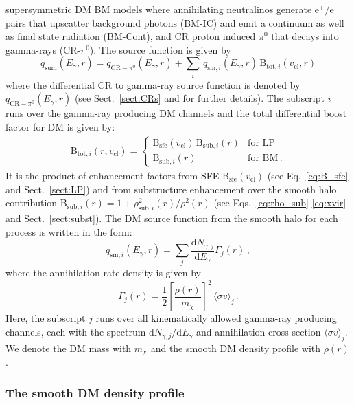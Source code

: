 \documentclass[10pt,aps,pra,reprint,amsmath,amsfonts,amssymb,showpacs,nofootinbib,floatfix]{revtex4-1}
\newcommand{\rmn}{\mathrm}
\newcommand{\sfe}{\rmn{sfe}}
\newcommand{\sub}{\rmn{sub}}
\newcommand{\B}{\rmn{B}}
\newcommand{\qCR}{q_{\rmn{CR}-\ensuremath{\pi^0}}}
\newcommand{\dd}{\rmn{d}}
\newcommand{\mx}{\ensuremath{m_{\chi}}}
\newcommand{\ngammaj}{\ensuremath{N_{\gamma,j}}}
\newcommand{\sigmaannv}{\ensuremath{\langle\sigma v\rangle}}
\newcommand{\sigv}{v_\rmn{cl}}
\newcommand{\egamma}{\ensuremath{E_{\gamma}}}
\newcommand{\eg}{E_\gamma}
\begin{document}
supersymmetric DM BM models where annihilating neutralinos generate
$\rmn{e}^+/\rmn{e}^-$ pairs that upscatter background photons (BM-IC)
and emit a continuum as well as final state radiation (BM-Cont), and
CR proton induced $\pi^0$ that decays into gamma-rays
(CR-$\pi^0$). The source function is given by
\begin{equation}
q_\rmn{sum} (\eg,r) = \qCR(\eg,r)+
\sum_i \,q_{\rmn{sm},i}(\eg,r)\,\B_{\rmn{tot},i}(\sigv,r)
\end{equation}
where the differential CR to gamma-ray source function is denoted
by $\qCR(\eg,r)$ (see Sect.~\ref{sect:CRs} and
\cite{2010MNRAS.409..449P} for further details). The subscript $i$
runs over the gamma-ray producing DM channels and the total
differential boost factor for DM is given by:
\begin{eqnarray}
\B_{\rmn{tot},i}(r,\sigv) = \left\{\begin{array}{cc}
\B_\sfe(\sigv)\,\B_{\sub,i}(r) &\rmn{for\,\,LP}\\
\B_{\sub,i}(r) &\rmn{for\,\,BM\,.}\end{array}\right.
\end{eqnarray}
It is the product of enhancement factors from SFE $\B_\sfe(\sigv)$
(see Eq.~\ref{eq:B_sfe} and Sect.~\ref{sect:LP}) and from substructure
enhancement over the smooth halo contribution $\B_{\sub,i}(r) =
1+\rho_{\sub,i}^2(r)/\rho^2(r)$ (see
Eqs.~\ref{eq:rho_sub}-\ref{eq:xvir} and Sect.~\ref{sect:subst}).  The
DM source function from the smooth halo for each process is written in
the form:
\begin{equation}
\label{eq:q_sm}
q_{\rmn{sm},i} (\egamma,r) = \sum_j
\frac{\dd \ngammaj}{\dd E_\gamma} \Gamma_j(r)\,,
\end{equation}
where the annihilation rate density is given by 
\begin{equation}
\label{eq:ann_rate}
\Gamma_j(r) = \frac{1}{2} \left[\frac{\rho(r)}{\mx}\right]^2 
\, \sigmaannv_j\,.
\end{equation}
Here, the subscript $j$ runs over all kinematically allowed gamma-ray
producing channels, each with the spectrum $\dd
  \ngammaj /\dd\eg$ and annihilation cross section $\sigmaannv_j$.
We denote the DM mass with $\mx$ and the smooth DM density profile
with $\rho(r)$.


\subsubsection{The smooth DM density profile}
\label{sect:smooth}
\end{document}
